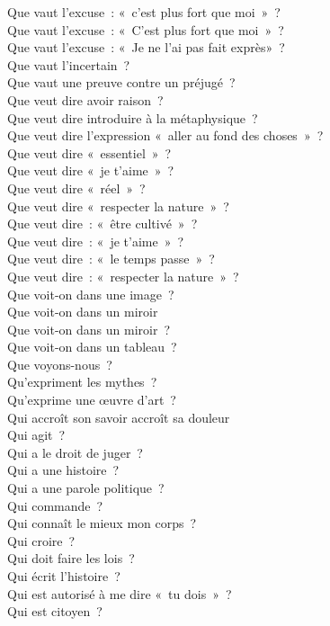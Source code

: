 \documentclass[a4paper,12pt]{article}
\begin{document}
Que vaut l'excuse : « c'est plus fort que moi » ? \\
Que vaut l'excuse : « C'est plus fort que moi » ? \\
Que vaut l'excuse : « Je ne l'ai pas fait exprès» ? \\
Que vaut l'incertain ? \\
Que vaut une preuve contre un préjugé ? \\
Que veut dire avoir raison ? \\
Que veut dire introduire à la métaphysique ? \\
Que veut dire l'expression « aller au fond des choses » ? \\
Que veut dire « essentiel » ? \\
Que veut dire « je t'aime » ? \\
Que veut dire « réel » ? \\
Que veut dire « respecter la nature » ? \\
Que veut dire : « être cultivé » ? \\
Que veut dire : « je t'aime » ? \\
Que veut dire : « le temps passe » ? \\
Que veut dire : « respecter la nature » ? \\
Que voit-on dans une image ? \\
Que voit-on dans un miroir \\
Que voit-on dans un miroir ? \\
Que voit-on dans un tableau ? \\
Que voyons-nous ? \\
Qu'expriment les mythes ? \\
Qu'exprime une œuvre d'art ? \\
Qui accroît son savoir accroît sa douleur \\
Qui agit ? \\
Qui a le droit de juger ? \\
Qui a une histoire ? \\
Qui a une parole politique ? \\
Qui commande ? \\
Qui connaît le mieux mon corps ? \\
Qui croire ? \\
Qui doit faire les lois ? \\
Qui écrit l'histoire ? \\
Qui est autorisé à me dire « tu dois » ? \\
Qui est citoyen ? \\
\end{document}
